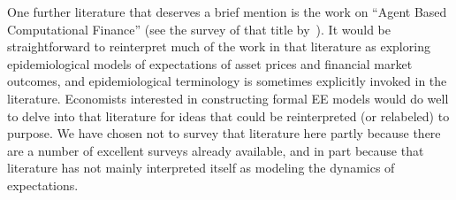 One further literature that deserves a brief mention is the work on ``Agent Based Computational Finance'' (see the survey of that title by~\cite{lebaronAgentCompFinance}).  It would be straightforward to reinterpret much of the work in that literature as exploring epidemiological models of expectations of asset prices and financial market outcomes, and epidemiological terminology is sometimes explicitly invoked in the literature.  Economists interested in constructing formal EE models would do well to delve into that literature for ideas that could be reinterpreted (or relabeled) to purpose.  We have chosen not to survey that literature here partly because there are a number of excellent surveys already available, and in part because that literature has not mainly interpreted itself as modeling the dynamics of expectations.